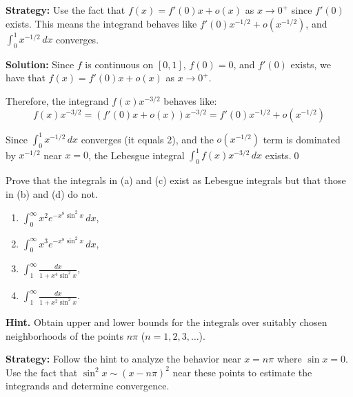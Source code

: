 \noindent\textbf{Strategy:} Use the fact that $f(x) = f'(0)x + o(x)$ as $x \to 0^+$ since $f'(0)$ exists. This means the integrand behaves like $f'(0)x^{-1/2} + o(x^{-1/2})$, and $\int_0^1 x^{-1/2} \, dx$ converges.

\bigskip\noindent\textbf{Solution:}
Since $f$ is continuous on $[0, 1]$, $f(0) = 0$, and $f'(0)$ exists, we have that $f(x) = f'(0)x + o(x)$ as $x \to 0^+$.

Therefore, the integrand $f(x)x^{-3/2}$ behaves like:
\[f(x)x^{-3/2} = (f'(0)x + o(x))x^{-3/2} = f'(0)x^{-1/2} + o(x^{-1/2})\]

Since $\int_{0}^{1} x^{-1/2} \, dx$ converges (it equals 2), and the $o(x^{-1/2})$ term is dominated by $x^{-1/2}$ near $x = 0$, the Lebesgue integral $\int_{0}^{1} f(x)x^{-3/2} \, dx$ exists.\qed


\begin{problembox}
Prove that the integrals in (a) and (c) exist as Lebesgue integrals but that those in (b) and (d) do not.
\begin{enumerate}[label=(\alph*)]
\item $\int_{0}^{\infty} x^2 e^{-x^8 \sin^2 x} \, dx$,
\item $\int_{0}^{\infty} x^3 e^{-x^8 \sin^2 x} \, dx$,
\item $\int_{1}^{\infty} \frac{dx}{1 + x^4 \sin^2 x}$,
\item $\int_{1}^{\infty} \frac{dx}{1 + x^2 \sin^2 x}.$
\end{enumerate}
\textbf{Hint.} Obtain upper and lower bounds for the integrals over suitably chosen neighborhoods of the points $n\pi$ ($n = 1, 2, 3, \ldots$).
\end{problembox}

\noindent\textbf{Strategy:} Follow the hint to analyze the behavior near $x = n\pi$ where $\sin x = 0$. Use the fact that $\sin^2 x \sim (x - n\pi)^2$ near these points to estimate the integrands and determine convergence.

